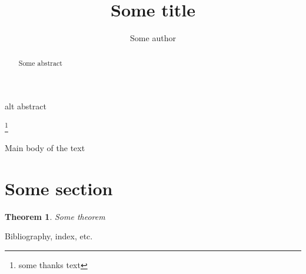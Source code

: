 \documentclass{smfart}
\title[short title]{Some title}
\author[short author]{Some author}
\newtheorem{thm}{Theorem}
\begin{document}
\begin{abstract}
Some abstract
\end{abstract}
\begin{altabstract}
alt abstract
\end{altabstract}
\thanks{some thanks text} %
\maketitle
\tableofcontents %
Main body of the text
\section{Some section}
\begin{thm}
Some theorem
\end{thm}
Bibliography, index, etc.
\end{document}
